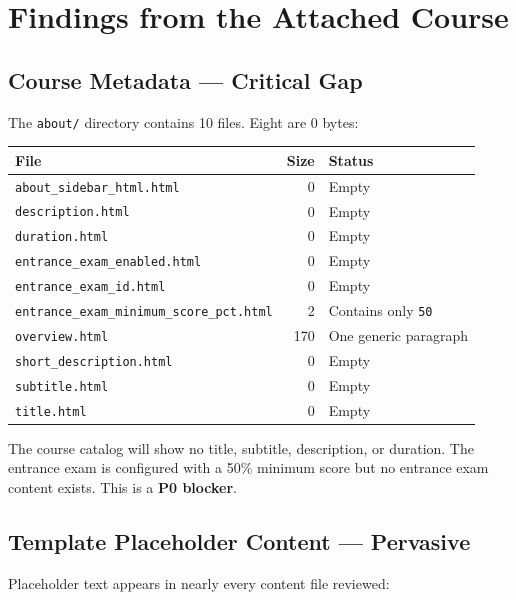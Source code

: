 \chapter{Findings from the Attached Course}

\section{Course Metadata — Critical Gap}

The \texttt{about/} directory contains 10 files. Eight are 0 bytes:

\begin{table}[h]
\centering
\begin{tabular}{@{}lrl@{}}
\toprule
\textbf{File} & \textbf{Size} & \textbf{Status} \\
\midrule
\texttt{about\_sidebar\_html.html} & 0 & Empty \\
\texttt{description.html} & 0 & Empty \\
\texttt{duration.html} & 0 & Empty \\
\texttt{entrance\_exam\_enabled.html} & 0 & Empty \\
\texttt{entrance\_exam\_id.html} & 0 & Empty \\
\texttt{entrance\_exam\_minimum\_score\_pct.html} & 2 & Contains only \texttt{50} \\
\texttt{overview.html} & 170 & One generic paragraph \\
\texttt{short\_description.html} & 0 & Empty \\
\texttt{subtitle.html} & 0 & Empty \\
\texttt{title.html} & 0 & Empty \\
\bottomrule
\end{tabular}
\end{table}

The course catalog will show no title, subtitle, description, or
duration. The entrance exam is configured with a 50\% minimum score
but no entrance exam content exists. This is a \textbf{P0 blocker}.

\section{Template Placeholder Content — Pervasive}

Placeholder text appears in nearly every content file reviewed:

